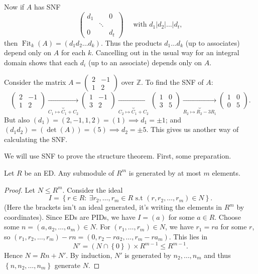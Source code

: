 \documentclass[egregdoesnotlikesansseriftitles,a4paper]{scrartcl}
\begin{document}
Now if $A$ has SNF \[
       \begin{pmatrix} d_1 &&0\\ & \ddots &\\ 0&&d_t \end{pmatrix} \quad \text{ with }  d_1 | d_2 | \ldots | d_{t}
,\] then $\operatorname{Fit}_{k}(A)= (d_1 d_2 \ldots d_{k})$. Thus the products $d_1 \ldots d_{k}$ (up to associates) depend only on $A$ for each $k$. Cancelling out in the usual way for an integral domain shows that each $d_{i}$ (up to an associate) depends only on $A$.
\begin{example*}
        Consider the matrix $A= \begin{pmatrix} 2&-1\\1&2 \end{pmatrix}$ over $\mathbb{Z}$. To find the SNF of $A$: \[
              \begin{pmatrix} 2&-1\\1&2 \end{pmatrix} \underbrace{\longrightarrow }_{C_1 \mapsto C_1 +C_2 }  \begin{pmatrix} 1&-1\\3&2 \end{pmatrix} \underbrace{\longrightarrow }_{C_2 \mapsto C_1 +C_2 } \begin{pmatrix} 1&0\\3&5 \end{pmatrix} \underbrace{\longrightarrow }_{R_2 \mapsto R_2 -3R_1 }\begin{pmatrix} 1&0\\0&5 \end{pmatrix}
        .\] But also $(d_1 )= (2,-1,1,2)=(1) \implies d_1 = \pm 1$; and $(d_1 d_2 )= (\operatorname{det}(A))=(5) \implies d_2 =\pm 5$. This gives us another way of calculating the SNF. 
\end{example*}
We will use SNF to prove the structure theorem. First, some preparation. 
\begin{lemma}\label{lem163}
        Let $R$ be an ED. Any submodule of $R^{m}$ is generated by at most $m$ elements.
        \begin{proof}
                Let $N \leq R^{m}$. Consider the ideal \[
                     I =\left\{r \in R: \ \exists r_2 , \ldots, r_{m} \in R \text{ s.t } (r, r_2 , \ldots, r_{m})\in N\right\}
                .\] (Here the brackets isn't an ideal generated, it's writing the elements in $R^{m}$ by coordinates). Since EDs are PIDs, we have $I= (a)$ for some $a \in R$. Choose some $n = (a, a_2 , \ldots, a_{m}) \in N$. For $(r_1 , \ldots, r_{m})\in N$, we have $r_1 =r a $ for some $r$, so $(r_1 , r_2 , \ldots, r_{m}) -rn = (0, r_2 -r a_2 , \ldots ,r_{m}-r a_{m})$. This lies in \[
                N' = (N \cap \left\{0\right\}) \times R^{m-1} \leq R^{m-1}
                .\] Hence $N= Rn+N'$. By induction, $N'$ is generated by $n_2 , \ldots, n_{m}$ and thus $\left\{n , n_2 , \ldots, n_{m}\right\}$ generate $N$.
        \end{proof}
\end{lemma}
\end{document}
